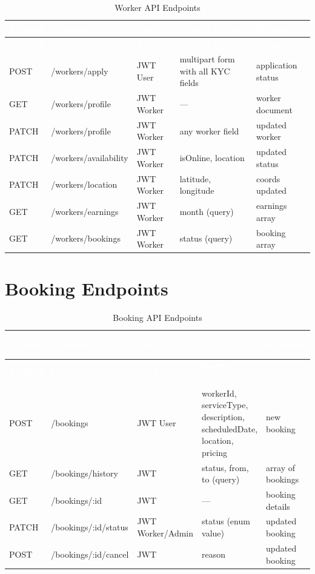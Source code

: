 \documentclass[12pt,a4paper]{report}
\newcommand{\thead}[1]{\cellcolor{tableheader}\textcolor{white}{\textbf{#1}}}
\begin{document}
\begin{longtable}{|p{1cm}|p{3.5cm}|p{1.5cm}|p{3.5cm}|p{3cm}|}
\caption{Worker API Endpoints}\label{tab:workerapi}\\
\hline
\thead{Method} & \thead{Endpoint} & \thead{Auth} & \thead{Body / Params} & \thead{Response} \\
\hline
\endfirsthead
\hline
\thead{Method} & \thead{Endpoint} & \thead{Auth} & \thead{Body / Params} & \thead{Response} \\
\hline
\endhead
POST & /workers/apply & JWT User & multipart form with all KYC fields & application status \\
\hline
GET & /workers/profile & JWT Worker & — & worker document \\
\hline
PATCH & /workers/profile & JWT Worker & any worker field & updated worker \\
\hline
PATCH & /workers/availability & JWT Worker & isOnline, location & updated status \\
\hline
PATCH & /workers/location & JWT Worker & latitude, longitude & coords updated \\
\hline
GET & /workers/earnings & JWT Worker & month (query) & earnings array \\
\hline
GET & /workers/bookings & JWT Worker & status (query) & booking array \\
\hline
\end{longtable}

\section{Booking Endpoints}

\begin{longtable}{|p{1cm}|p{3.5cm}|p{1.5cm}|p{3.5cm}|p{3cm}|}
\caption{Booking API Endpoints}\label{tab:bookingapi}\\
\hline
\thead{Method} & \thead{Endpoint} & \thead{Auth} & \thead{Body / Params} & \thead{Response} \\
\hline
\endfirsthead
\hline
\thead{Method} & \thead{Endpoint} & \thead{Auth} & \thead{Body / Params} & \thead{Response} \\
\hline
\endhead
POST & /bookings & JWT User & workerId, serviceType, description, scheduledDate, location, pricing & new booking \\
\hline
GET & /bookings/history & JWT & status, from, to (query) & array of bookings \\
\hline
GET & /bookings/:id & JWT & — & booking details \\
\hline
PATCH & /bookings/:id/status & JWT Worker/Admin & status (enum value) & updated booking \\
\hline
POST & /bookings/:id/cancel & JWT & reason & updated booking \\
\hline
\end{longtable}
\end{document}
